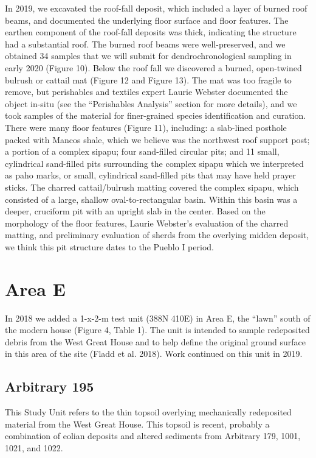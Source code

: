 \documentclass[
  12pt,
]{krantz}
\begin{document}
In 2019, we excavated the roof-fall deposit, which included a layer of
burned roof beams, and documented the underlying floor surface and floor
features. The earthen component of the roof-fall deposits was thick,
indicating the structure had a substantial roof. The burned roof beams
were well-preserved, and we obtained 34 samples that we will submit for
dendrochronological sampling in early 2020 (Figure 10). Below the roof
fall we discovered a burned, open-twined bulrush or cattail mat (Figure
12 and Figure 13). The mat was too fragile to remove, but perishables
and textiles expert Laurie Webster documented the object in-situ (see
the ``Perishables Analysis'' section for more details), and we took
samples of the material for finer-grained species identification and
curation. There were many floor features (Figure 11), including: a
slab-lined posthole packed with Mancos shale, which we believe was the
northwest roof support post; a portion of a complex sipapu; four
sand-filled circular pits; and 11 small, cylindrical sand-filled pits
surrounding the complex sipapu which we interpreted as paho marks, or
small, cylindrical sand-filled pits that may have held prayer sticks.
The charred cattail/bulrush matting covered the complex sipapu, which
consisted of a large, shallow oval-to-rectangular basin. Within this
basin was a deeper, cruciform pit with an upright slab in the center.
Based on the morphology of the floor features, Laurie Webster's
evaluation of the charred matting, and preliminary evaluation of sherds
from the overlying midden deposit, we think this pit structure dates to
the Pueblo I period.

\hypertarget{area-e}{%
\section{Area E}\label{area-e}}

In 2018 we added a 1-x-2-m test unit (388N 410E) in Area E, the ``lawn''
south of the modern house (Figure 4, Table 1). The unit is intended to
sample redeposited debris from the West Great House and to help define
the original ground surface in this area of the site (Fladd et al.
2018). Work continued on this unit in 2019.

\hypertarget{arbitrary-195}{%
\subsection{Arbitrary 195}\label{arbitrary-195}}

This Study Unit refers to the thin topsoil overlying mechanically
redeposited material from the West Great House. This topsoil is recent,
probably a combination of eolian deposits and altered sediments from
Arbitrary 179, 1001, 1021, and 1022.
\end{document}
